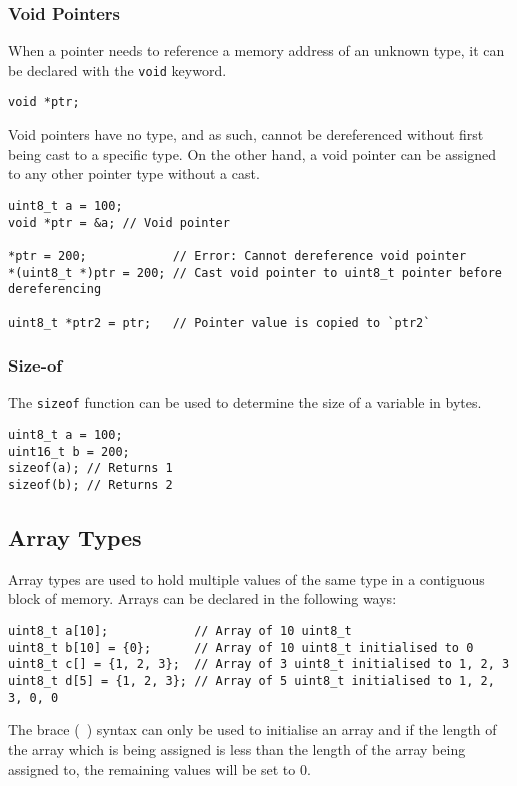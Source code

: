 \documentclass{article}
\begin{document}
\subsubsection{Void Pointers}
When a pointer needs to reference a memory address of an unknown type,
it can be declared with the \texttt{void} keyword.
\begin{verbatim}
void *ptr;
\end{verbatim}
Void pointers have no type, and as such, cannot be dereferenced without
first being cast to a specific type. On the other hand, a void pointer
can be assigned to any other pointer type without a cast.
\begin{verbatim}
uint8_t a = 100;
void *ptr = &a; // Void pointer

*ptr = 200;            // Error: Cannot dereference void pointer
*(uint8_t *)ptr = 200; // Cast void pointer to uint8_t pointer before dereferencing

uint8_t *ptr2 = ptr;   // Pointer value is copied to `ptr2`
\end{verbatim}
\subsubsection{Size-of}
The \texttt{sizeof} function can be used to determine the size
of a variable in bytes.
\begin{verbatim}
uint8_t a = 100;
uint16_t b = 200;
sizeof(a); // Returns 1
sizeof(b); // Returns 2
\end{verbatim}
\subsection{Array Types}
Array types are used to hold multiple values of the same type in a
contiguous block of memory. Arrays can be declared in the following
ways:
\begin{verbatim}
uint8_t a[10];            // Array of 10 uint8_t
uint8_t b[10] = {0};      // Array of 10 uint8_t initialised to 0
uint8_t c[] = {1, 2, 3};  // Array of 3 uint8_t initialised to 1, 2, 3
uint8_t d[5] = {1, 2, 3}; // Array of 5 uint8_t initialised to 1, 2, 3, 0, 0
\end{verbatim}
The brace (\texttt{{ }}) syntax can only be used to initialise
an array and if the length of the array which is being assigned is less
than the length of the array being assigned to, the remaining values
will be set to 0.
\end{document}
